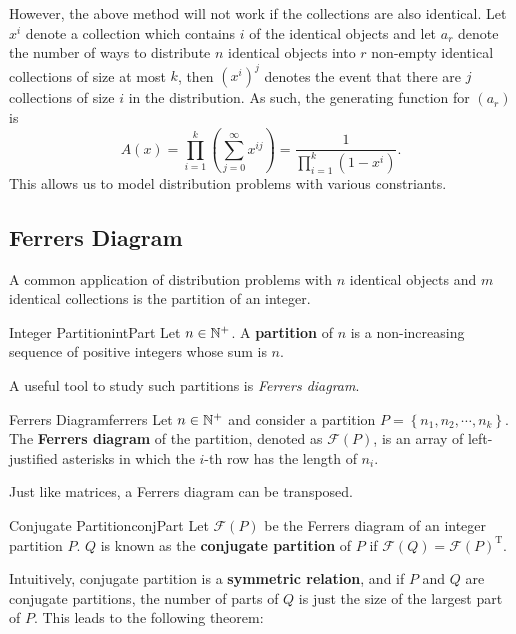 \documentclass[math]{amznotes}
\theoremstyle{remark}
\begin{document}
However, the above method will not work if the collections are also identical. Let $x^i$ denote a collection which contains $i$ of the identical objects and let $a_r$ denote the number of ways to distribute $n$ identical objects into $r$ non-empty identical collections of size at most $k$, then $\left(x^i\right)^j$ denotes the event that there are $j$ collections of size $i$ in the distribution. As such, the generating function for $(a_r)$ is
\begin{equation*}
    A(x) = \prod_{i = 1}^{k}\left(\sum_{j = 0}^{\infty}x^{ij}\right) = \frac{1}{\prod_{i = 1}^{k}(1 - x^i)}.
\end{equation*}
This allows us to model distribution problems with various constriants.

\subsection{Ferrers Diagram}
A common application of distribution problems with $n$ identical objects and $m$ identical collections is the partition of an integer.
\begin{dfnbox}{Integer Partition}{intPart}
    Let $n \in \mathbb{N}^+$. A {\color{red} \textbf{partition}} of $n$ is a non-increasing sequence of positive integers whose sum is $n$. 
\end{dfnbox}
A useful tool to study such partitions is \textit{Ferrers diagram}.
\begin{dfnbox}{Ferrers Diagram}{ferrers}
    Let $n \in \mathbb{N}^+$ and consider a partition $P = \left\{n_1, n_2, \cdots, n_k\right\}$. The {\color{red} \textbf{Ferrers diagram}} of the partition, denoted as $\mathcal{F}(P)$, is an array of left-justified asterisks in which the $i$-th row has the length of $n_i$.
\end{dfnbox}
Just like matrices, a Ferrers diagram can be transposed.
\begin{dfnbox}{Conjugate Partition}{conjPart}
    Let $\mathcal{F}(P)$ be the Ferrers diagram of an integer partition $P$. $Q$ is known as the {\color{red} \textbf{conjugate partition}} of $P$ if $\mathcal{F}(Q) = \mathcal{F}(P)^{\mathrm{T}}$.
\end{dfnbox}
Intuitively, conjugate partition is a \textbf{symmetric relation}, and if $P$ and $Q$ are conjugate partitions, the number of parts of $Q$ is just the size of the largest part of $P$. This leads to the following theorem:
\end{document}
